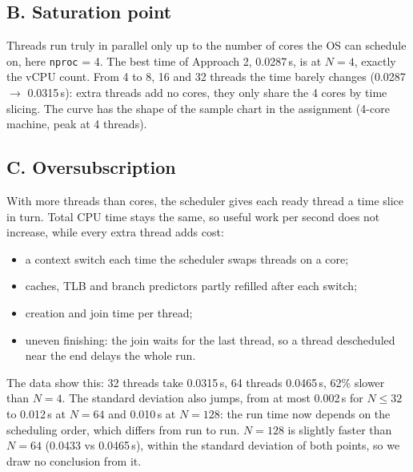 \documentclass[11pt,a4paper]{article}
\newcommand{\code}[1]{\texttt{#1}}
\begin{document}
\subsection{B. Saturation point}
\label{sec:B}
Threads run truly in parallel only up to the number of cores the OS can schedule on, here \code{nproc} = 4. The best time of Approach 2, 0.0287\,s, is at $N=4$, exactly the vCPU count. From 4 to 8, 16 and 32 threads the time barely changes (0.0287 $\to$ 0.0315\,s): extra threads add no cores, they only share the 4 cores by time slicing. The curve has the shape of the sample chart in the assignment (4-core machine, peak at 4 threads).

\subsection{C. Oversubscription}
\label{sec:C}
With more threads than cores, the scheduler gives each ready thread a time slice in turn. Total CPU time stays the same, so useful work per second does not increase, while every extra thread adds cost:
\begin{itemize}[nosep]
  \item a context switch each time the scheduler swaps threads on a core;
  \item caches, TLB and branch predictors partly refilled after each switch;
  \item creation and join time per thread;
  \item uneven finishing: the join waits for the last thread, so a thread descheduled near the end delays the whole run.
\end{itemize}
The data show this: 32 threads take 0.0315\,s, 64 threads 0.0465\,s, 62\% slower than $N=4$. The standard deviation also jumps, from at most 0.002\,s for $N\le32$ to 0.012\,s at $N=64$ and 0.010\,s at $N=128$: the run time now depends on the scheduling order, which differs from run to run. $N=128$ is slightly faster than $N=64$ (0.0433 vs 0.0465\,s), within the standard deviation of both points, so we draw no conclusion from it.
\end{document}
